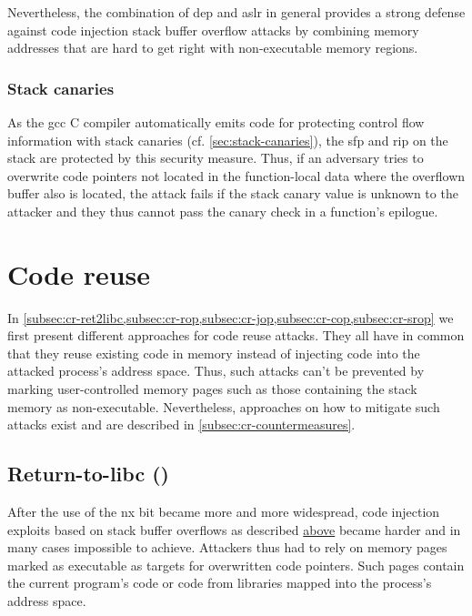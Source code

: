 Nevertheless, the combination of \gls{dep} and \gls{aslr} in general provides a strong defense against code injection stack buffer overflow attacks by combining memory addresses that are hard to get right with non-executable memory regions.

\subsubsection{Stack canaries}
\label{subsubsec:ci-stack-canaries}

As the \gls{gcc} C compiler automatically emits code for protecting control flow information with stack canaries (cf. \cref{sec:stack-canaries}), the \gls{sfp} and \gls{rip} on the stack are protected by this security measure.
Thus, if an adversary tries to overwrite code pointers not located in the function-local data where the overflown buffer also is located, the attack fails if the stack canary value is unknown to the attacker and they thus cannot pass the canary check in a function's epilogue.

\section{Code reuse}
\label{sec:code-reuse}

In \cref{subsec:cr-ret2libc,subsec:cr-rop,subsec:cr-jop,subsec:cr-cop,subsec:cr-srop} we first present different approaches for code reuse attacks.
They all have in common that they reuse existing code in memory instead of injecting code into the attacked process's address space.
Thus, such attacks can't be prevented by marking user-controlled memory pages such as those containing the stack memory as non-executable.
Nevertheless, approaches on how to mitigate such attacks exist and are described in \cref{subsec:cr-countermeasures}.

\subsection{Return-to-libc ()}
\label{subsec:cr-ret2libc}

After the use of the \gls{nx} bit became more and more widespread, code injection exploits based on stack buffer overflows as described \hyperref[sec:code-injection]{above} became harder and in many cases impossible to achieve.
Attackers thus had to rely on memory pages marked as executable as targets for overwritten code pointers.
Such pages contain the current program's code or code from libraries mapped into the process's address space.

